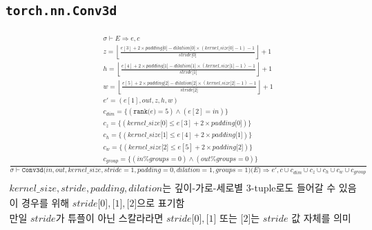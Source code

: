 \documentclass{article}
\newcommand{\x}{\times}
\newcommand{\rem}{\mtt{\%}}
\newcommand{\Rar}{\Rightarrow}
\newcommand{\ttt}[1]{\texttt{#1}}
\newcommand{\mtt}[1]{\mathtt{#1}}
\newcommand{\op}[2]{\mtt{#1(}#2\mtt{)}}
\newcommand{\module}[3]{\mtt{#1(}#2\mtt{)(}#3\mtt{)}}
\newcommand{\ind}[1]{\mtt{[}#1\mtt{]}}
\begin{document}
\subsection*{\ttt{torch.nn.Conv3d}}%
\begin{align*}
  \frac
  {
    \begin{array}{l}
      \sigma \vdash E \Rar e, c \\
      z = \left\lfloor \frac{e[3] + 2 \x padding \ind{0} - dilation \ind{0}
        \x (kernel\_size \ind{0} - 1) - 1}{stride \ind{0}} \right\rfloor + 1 \\
      h = \left\lfloor \frac{e[4] + 2 \x padding \ind{1} - dilation \ind{1}
        \x (kernel\_size \ind{1} - 1) - 1}{stride \ind{1}} \right\rfloor + 1 \\
      w = \left\lfloor \frac{e[5] + 2 \x padding \ind{2} - dilation \ind{2}
        \x (kernel\_size \ind{2} - 1) - 1}{stride \ind{2}} \right\rfloor + 1 \\
      e' = (e[1], out, z, h, w) \\
      c_{dim} = \{ (\op{rank}{e} = 5) \land (e[2] = in) \} \\
      c_z = \{ (kernel\_size\ind{0} \leq e[3] + 2 \x padding \ind{0}) \} \\
      c_h = \{ (kernel\_size\ind{1} \leq e[4] + 2 \x padding \ind{1}) \} \\
      c_w = \{ (kernel\_size\ind{2} \leq e[5] + 2 \x padding \ind{2}) \} \\
      c_{group} = \{ (in \rem groups = 0) \land (out \rem groups = 0) \}
    \end{array}
  }
  {
    \sigma \vdash \module{Conv3d}{in, out, kernel\_size, stride=1, padding=0,
      dilation=1, groups=1}{E} \Rar e', c \cup c_{dim} \cup c_z \cup c_h \cup
      c_w \cup c_{group}
  } \\
  \\
  \text{$kernel\_size, stride, padding, dilation$는 깊이-가로-세로별 3-tuple로도
  들어갈 수 있음} \\
  \text{이 경우를 위해 $stride\ind{0}, \ind{1}, \ind{2}$으로 표기함} \\
  \text{만일 $stride$가 튜플이 아닌 스칼라라면 $stride\ind{0}, \ind{1}$ 또는 
  $\ind{2}$는 $stride$ 값 자체를 의미}
\end{align*}
\end{document}
